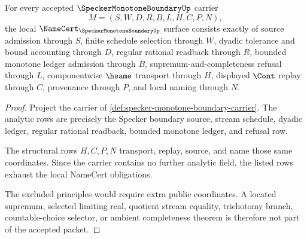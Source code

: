 \begin{theorem}
\label{thm:specker-monotone-boundary-namecert-obligations}
For every accepted $\SpeckerMonotoneBoundaryUp$ carrier
$$
M=(S,W,D,R,B,L,H,C,P,N),
$$
the local $\NameCert_{\SpeckerMonotoneBoundaryUp}$ surface consists exactly of source admission through $S$, finite schedule selection through $W$, dyadic tolerance and bound accounting through $D$, regular rational readback through $R$, bounded monotone ledger admission through $B$, supremum-and-completeness refusal through $L$, componentwise $\hsame$ transport through $H$, displayed $\Cont$ replay through $C$, provenance through $P$, and local naming through $N$.
\end{theorem}
\begin{proof}
Project the carrier of \autoref{def:specker-monotone-boundary-carrier}. The analytic rows are precisely the Specker boundary source, stream schedule, dyadic ledger, regular rational readback, bounded monotone ledger, and refusal row.

The structural rows $H,C,P,N$ transport, replay, source, and name those same coordinates. Since the carrier contains no further analytic field, the listed rows exhaust the local NameCert obligations.

The excluded principles would require extra public coordinates. A located supremum, selected limiting real, quotient stream equality, trichotomy branch, countable-choice selector, or ambient completeness theorem is therefore not part of the accepted packet.
\end{proof}

